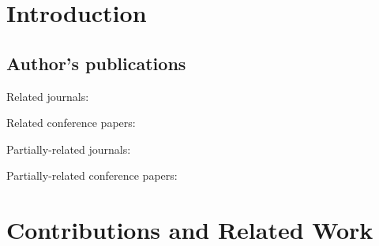 \documentclass[a4paper,11pt,titlepage,twoside]{book}
\newcommand{\chapternoclear}[1]{
  \begingroup
  \let\cleardoublepage\clearpage
  \chapter{#1}
  \endgroup
}
\newcommand{\conditionalClearPage}{
  \ifdefined\printversion
  \clearemptydoublepage
  \else
  \newpage{}
  \clearpage
  \fi
}
\begin{document}


\conditionalClearPage


\conditionalClearPage


\conditionalClearPage


\pagestyle{fancy}

\conditionalClearPage
\tableofcontents



\chapternoclear{Introduction}


\section{Author's publications}

Related journals:
\cite{baca2018rospix}
\cite{baca2019autonomous}
\cite{spurny2019cooperative}
\cite{saska2017system}
\cite{giernacki2019realtime}
\cite{chudoba2016exploration}
\cite{saska2020formation}
\cite{loianno2018localization}
\cite{petrlik2020robust}
\cite{stibinger2020localization}
\cite{saikin2020wildfire}
\cite{baca2020mrs}
\cite{petracek2020bioinspired}
\cite{kratky2020autonomous2}
\cite{stasinchuk2020multiuav}
\cite{dmytruk2020safe}
\cite{smrcka2020admittance}
\cite{walter2020extinguishing}
\cite{silano2020power}

Related conference papers:
\cite{baca2019timepix}
\cite{baca2018model}
\cite{baca2016embedded}
\cite{baca2017autonomous}
\cite{saska2017documentation}
\cite{spurny2016complex}
\cite{faigl2017onsolution}
\cite{saska2016formations}
\cite{roucek2019darpa}
\cite{baca2020gamma}

Partially-related journals:
\cite{baca2016miniaturized}
\cite{baca2018timepix}
\cite{daniel2019inorbit}
\cite{urban2017vzlusat}
\cite{urban2020rex}

Partially-related conference papers:
\cite{daniel2016terrestrial}
\cite{daniel2017xray}





\chapternoclear{Contributions and Related Work}

\end{document}

